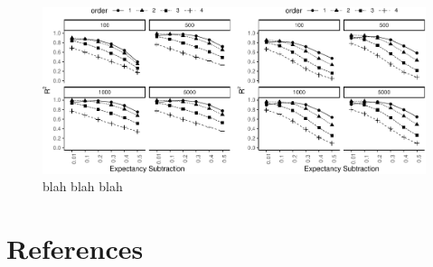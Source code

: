 \documentclass[
  jou]{apa6}
\begin{document}
\begin{figure}

{\centering \includegraphics[width=\textwidth]{ITS_cogsci_files/figure-latex/allsims-1} 

}

\caption{blah blah blah}\label{fig:allsims}
\end{figure}

\newpage

\hypertarget{references}{%
\section{References}\label{references}}

\begingroup
\setlength{\parindent}{-0.5in}
\setlength{\leftskip}{0.5in}
\end{document}
